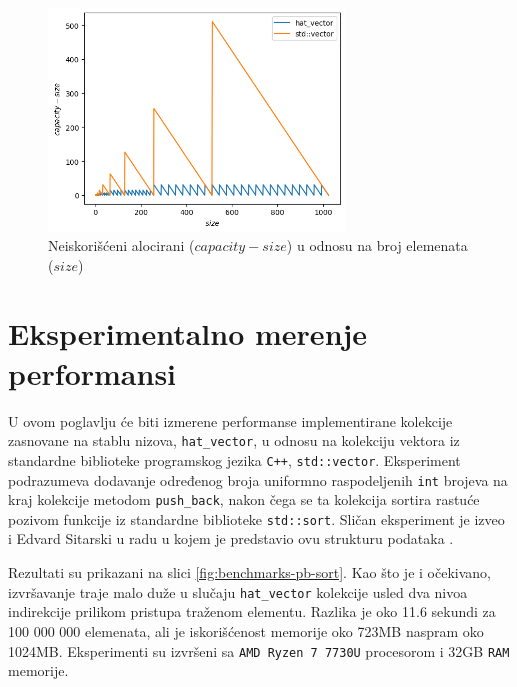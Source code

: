 \documentclass[a4paper]{article}
\begin{document}
\begin{figure}[h!]
    \centering
    \includegraphics[width=0.70\textwidth]{ilustracije/cap-size-razlika.png}
    \caption{Neiskorišćeni alocirani ($capacity - size$) u odnosu na broj elemenata ($size$)}
    \label{fig:cap-size-razlika}
\end{figure}

\section{Eksperimentalno merenje performansi}

U ovom poglavlju će biti izmerene performanse implementirane kolekcije zasnovane na stablu nizova, \verb|hat_vector|, u odnosu na kolekciju vektora iz standardne biblioteke programskog jezika \verb|C++|, \verb|std::vector|. Eksperiment podrazumeva dodavanje određenog broja uniformno raspodeljenih \verb|int| brojeva na kraj kolekcije metodom \verb|push_back|, nakon čega se ta kolekcija sortira rastuće pozivom funkcije iz standardne biblioteke \verb|std::sort|. Sličan eksperiment je izveo i Edvard Sitarski u radu u kojem je predstavio ovu strukturu podataka \cite{hat-sitarski}.

Rezultati su prikazani na slici \ref{fig:benchmarks-pb-sort}. Kao što je i očekivano, izvršavanje traje malo duže u slučaju \verb|hat_vector| kolekcije usled dva nivoa indirekcije prilikom pristupa traženom elementu. Razlika je oko 11.6 sekundi za 100 000 000 elemenata, ali je iskorišćenost memorije oko 723MB naspram oko 1024MB. Eksperimenti su izvršeni sa \verb|AMD Ryzen 7 7730U| procesorom i 32GB \verb|RAM| memorije.
\end{document}
